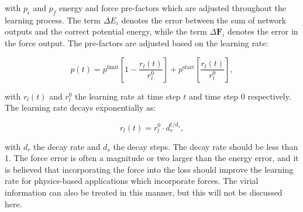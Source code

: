 with $p_{\epsilon}$ and $p_{f}$ energy and force pre-factors which are
adjusted throughout the learning process. The term $\Delta E_i$
denotes the error between the sum of network outputs
and the correct potential energy, while the term $\Delta \bm{F}_i$
denotes the error in the force output.
The pre-factors are adjusted based on the learning rate:

\begin{equation}
    p(t) = p^{\text{limit}} \left[ 1 - \frac{r_l(t)}{r_l^0} \right]
    + p^{\text{start}} \left[ \frac{r_l(t)}{r_l^0} \right] ,
\end{equation}

with $r_l(t)$ and $r_l^0$ the learning rate at time step $t$ and time step
$0$ respectively. The learning rate decays exponentially as:

$$ r_l(t) = r_l^0 \cdot d_r^{t / d_s} , $$

with $d_r$ the decay rate and $d_s$ the decay steps. The decay
rate should be less than 1. The force error is often a magnitude or two
larger than the energy error, and it is believed that incorporating
the force into the loss should improve the learning rate for
physics-based applications which incorporate forces.
The virial information can also be treated in this manner,
but this will not be discussed here.
